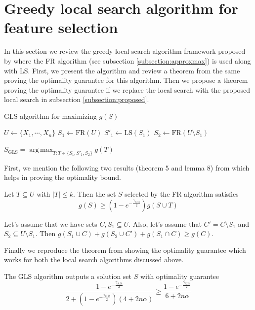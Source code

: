 \section{Greedy local search algorithm for feature selection}
\label{section:gls}
In this section we review the greedy local search algorithm framework proposed by \citealp{NIPS2012_4689} where the FR algorithm (see subsection \ref{subsection:approxmax}) is used along with LS. First, we present the algorithm and review a theorem from the same proving the optimality guarantee for this algorithm. Then we propose a theorem proving the optimality guarantee if we replace the local search with the proposed local search in subsection \ref{subsection:proposed}.

\begin{algorithm}
GLS algorithm for maximizing $g(S)$
\begin{algorithmic}[1]
\State $U\gets \{X_1,\cdots,X_n\}$
\State $S_1\gets \text{FR}(U)$
\State $S'_1\gets \text{LS}(S_1)$
\State $S_2\gets \text{FR}(U\setminus S_1)$
\end{algorithmic}
\Return $S_{\text{GLS}}=\operatorname*{arg\,max}_{T:T\in\{S_1,S'_1,S_2\}} g(T)$
\end{algorithm}

\noindent First, we mention the following two results (theorem 5 and lemma 8) from \citealp{NIPS2012_4689} which helps in proving the optimality bound.

\begin{theorem}
\label{thm:fr}
 Let $T\subseteq U$ with $|T|\le k$. Then the set $S$ selected by the FR algorithm satisfies 
 \[g(S)\ge (1-e^{-\frac{\gamma_{S,2k}}{2}})g(S\cup T)\]
\end{theorem}

\begin{lemma}
\label{lem:help}
 Let's assume that we have sets $C,S_1\subseteq U$. Also, let's assume that $C'=C\setminus S_1$ and $S_2\subseteq U\setminus S_1$. Then $g(S_1\cup C)+g(S_2\cup C')+g(S_1\cap C)\ge g(C)$.
\end{lemma}

\noindent Finally we reproduce the theorem from \citealp{NIPS2012_4689} showing the optimality guarantee which works for both the local search algorithms discussed above.

\begin{theorem}
 The GLS algorithm outputs a solution set $S$ with optimality guarantee
 \[\frac{1-e^{-\frac{\gamma_{S,2k}}{2}}}{2+(1-e^{-\frac{\gamma_{S,2k}}{2}})(4+2n\alpha)}\ge \frac{1-e^{-\frac{\gamma_{S,2k}}{2}}}{6+2n\alpha}\]
\end{theorem}

